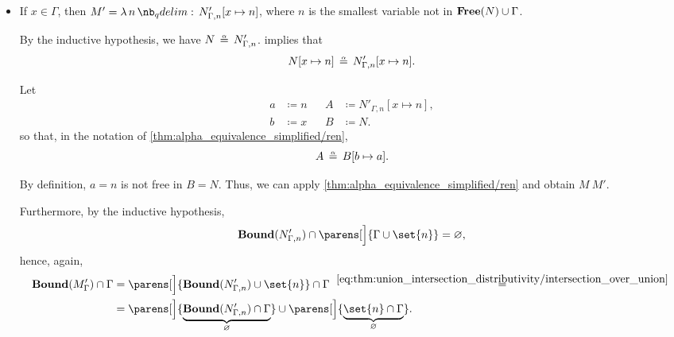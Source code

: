 \begin{defproof}
\begin{itemize}
\begin{itemize}
      \item If \( x \in \Gamma \), then \( M' = \qabs n N'_{\Gamma,n}[x \mapsto n] \), where \( n \) is the smallest variable not in \( \op*{Free}(N) \cup \Gamma \).

      By the inductive hypothesis, we have \( N \aequiv N'_{\Gamma,n} \).  implies that
      \begin{equation*}
        N[x \mapsto n] \aequiv N'_{\Gamma,n}[x \mapsto n].
      \end{equation*}

      Let
      \begin{align*}
        a &\coloneqq n && A &\coloneqq N'_{\Gamma,n}[x \mapsto n], \\
        b &\coloneqq x && B &\coloneqq N.
      \end{align*}
      so that, in the notation of \ref{thm:alpha_equivalence_simplified/ren},
      \begin{equation*}
        A \aequiv B[b \mapsto a].
      \end{equation*}

      By definition, \( a = n \) is not free in \( B = N \). Thus, we can apply \ref{thm:alpha_equivalence_simplified/ren} and obtain \( M \ M' \).


      Furthermore, by the inductive hypothesis,
      \begin{equation*}
        \op*{Bound}(N'_{\Gamma,n}) \cap \parens[\Big]{ \Gamma \cup \set{ n } } = \varnothing,
      \end{equation*}
      hence, again,
      \begin{align*}
        \op*{Bound}(M'_\Gamma) \cap \Gamma
        &=
        \parens[\Big]{ \op*{Bound}(N'_{\Gamma,n}) \cup \set{ n } } \cap \Gamma
        \reloset {\eqref{eq:thm:union_intersection_distributivity/intersection_over_union}} = \\ &=
        \parens[\Big]{ \underbrace{\op*{Bound}(N'_{\Gamma,n}) \cap \Gamma }_\varnothing } \cup \parens[\Big]{ \underbrace{\set{ n } \cap \Gamma}_\varnothing }.
      \end{align*}
    \end{itemize}
  \end{itemize}
\end{defproof}
